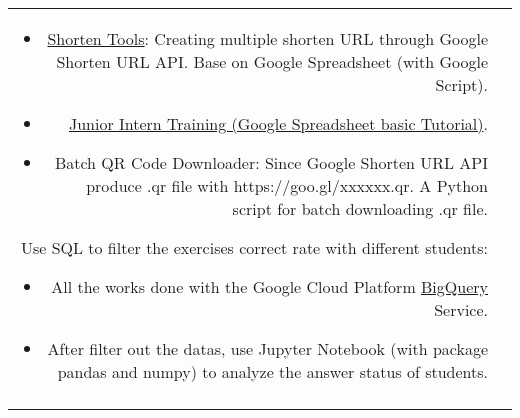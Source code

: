 \documentclass[a4paper,10pt]{article}
\begin{document}
\begin{tabular}{r|p{11cm}}
{\begin{itemize}
  \item \href{https://goo.gl/GzxKda}{Shorten Tools}: Creating multiple shorten URL through Google Shorten URL API. Base on Google Spreadsheet (with Google Script).
  \item \href{https://hackmd.io/s/Byx0ogAXW}{Junior Intern Training (Google Spreadsheet basic Tutorial)}.
  \item Batch QR Code Downloader: Since Google Shorten URL API produce .qr file with https://goo.gl/xxxxxx.qr. A Python script for batch downloading .qr file.
\end{itemize}
Use SQL to filter the exercises correct rate with different students:
\begin{itemize}
  \item All the works done with the Google Cloud Platform \href{https://cloud.google.com/bigquery/}{BigQuery} Service.
  \item After filter out the datas, use Jupyter Notebook (with package pandas and numpy) to analyze the answer status of students.
\end{itemize}
}                                                                                                           \\
\multicolumn{2}{c}{}                                                                                        \\
\end{tabular}

\end{document}
